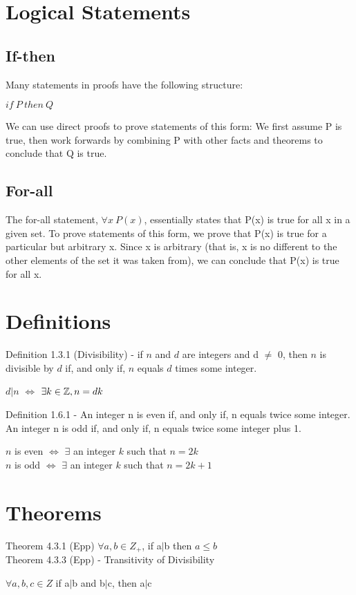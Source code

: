 \documentclass[a4paper]{article}
\begin{document}
\section{Logical Statements}
\subsection{If-then}
Many statements in proofs have the following structure:\\ \begin{center}$if\ P\ then\ Q$ \end{center}
We can use direct proofs to prove statements of this form: We first assume P is true, then work forwards by combining P with other facts and theorems to conclude that Q is true.

\subsection{For-all}
The for-all statement, $\forall x\ P(x)$,
essentially states that P(x) is true for all x in a given set. To prove statements of this form, we prove that P(x) is true for a particular but arbitrary x. Since x is arbitrary (that is, x is no different to the other elements of the set it was taken from), we can conclude that P(x) is true for all x.

\appendix
\section{Definitions}
Definition 1.3.1 (Divisibility) - if $n$ and $d$ are integers and d $\neq$ 0, then $n$ is divisible by $d$ if, and only if, $n$ equals $d$ times some integer.
\begin{center} $d|n$ $\Longleftrightarrow$ $\exists k \in \mathbb{Z}, n=dk$ \end{center}
Definition 1.6.1 - An integer n is even if, and only if, n equals twice some integer.\\An integer n is odd if, and only if, n equals twice some integer plus 1.
\begin{center}$n$ is even $\Longleftrightarrow$ $\exists$ an integer $k$ such that $n=2k$\\
$n$ is odd $\Longleftrightarrow$ $\exists$ an integer $k$ such that $n=2k+1$\end{center}
\section{Theorems}
Theorem 4.3.1 (Epp) $\forall a,b \in Z_{+}$, if a$|$b then $a \le b$\\
Theorem 4.3.3 (Epp) - Transitivity of Divisibility
\begin{center} $\forall a,b,c \in Z$ if a$|$b and b$|$c, then a$|$c \end{center}
\end{document}
